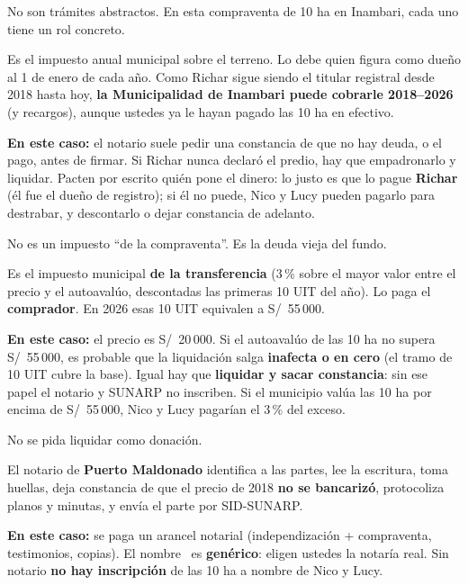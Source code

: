 \documentclass[12pt,a4paper]{article}
\begin{document}


\noindent No son trámites abstractos. En esta compraventa de 10 ha en Inambari, cada uno tiene un rol concreto.

Es el impuesto anual municipal sobre el terreno. Lo debe quien figura como dueño al 1 de enero de cada año. Como Richar sigue siendo el titular registral desde 2018 hasta hoy, \textbf{la Municipalidad de Inambari puede cobrarle 2018--2026} (y recargos), aunque ustedes ya le hayan pagado las 10 ha en efectivo.

\textbf{En este caso:} el notario suele pedir una constancia de que no hay deuda, o el pago, antes de firmar. Si Richar nunca declaró el predio, hay que empadronarlo y liquidar. Pacten por escrito quién pone el dinero: lo justo es que lo pague \textbf{Richar} (él fue el dueño de registro); si él no puede, Nico y Lucy pueden pagarlo para destrabar, y descontarlo o dejar constancia de adelanto.

No es un impuesto ``de la compraventa''. Es la deuda vieja del fundo.

Es el impuesto municipal \textbf{de la transferencia} (3\,\% sobre el mayor valor entre el precio y el autoavalúo, descontadas las primeras 10 UIT del año). Lo paga el \textbf{comprador}. En 2026 esas 10 UIT equivalen a S/\ 55\,000.

\textbf{En este caso:} el precio es S/\ 20\,000. Si el autoavalúo de las 10 ha no supera S/\ 55\,000, es probable que la liquidación salga \textbf{inafecta o en cero} (el tramo de 10 UIT cubre la base). Igual hay que \textbf{liquidar y sacar constancia}: sin ese papel el notario y SUNARP no inscriben. Si el municipio valúa las 10 ha por encima de S/\ 55\,000, Nico y Lucy pagarían el 3\,\% del exceso.

No se pida liquidar como donación.

El notario de \textbf{Puerto Maldonado} identifica a las partes, lee la escritura, toma huellas, deja constancia de que el precio de 2018 \textbf{no se bancarizó}, protocoliza planos y minutas, y envía el parte por SID-SUNARP.

\textbf{En este caso:} se paga un arancel notarial (independización + compraventa, testimonios, copias). El nombre \NotarioNombre\ es \textbf{genérico}: eligen ustedes la notaría real. Sin notario \textbf{no hay inscripción} de las 10 ha a nombre de Nico y Lucy.
\end{document}
